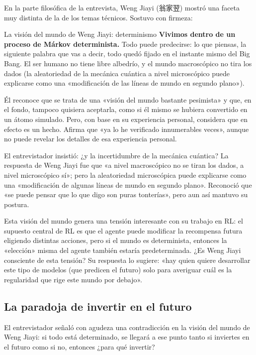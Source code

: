 \documentclass[a4paper]{article}
\begin{document}
En la parte filosófica de la entrevista, Weng Jiayi (翁家翌) mostró una faceta muy distinta de la de los temas técnicos. Sostuvo con firmeza:

\begin{importantbox}{La visión del mundo de Weng Jiayi: determinismo}
\textbf{Vivimos dentro de un proceso de Márkov determinista.} Todo puede predecirse: lo que piensas, la siguiente palabra que vas a decir, todo quedó fijado en el instante mismo del Big Bang. El ser humano no tiene libre albedrío, y el mundo macroscópico no tira los dados (la aleatoriedad de la mecánica cuántica a nivel microscópico puede explicarse como una «modificación de las líneas de mundo en segundo plano»).
\end{importantbox}

Él reconoce que se trata de una «visión del mundo bastante pesimista» y que, en el fondo, tampoco quisiera aceptarla, como si él mismo se hubiera convertido en un átomo simulado. Pero, con base en su experiencia personal, considera que en efecto es un hecho. Afirma que «ya lo he verificado innumerables veces», aunque no puede revelar los detalles de esa experiencia personal.

El entrevistador insistió: ¿y la incertidumbre de la mecánica cuántica? La respuesta de Weng Jiayi fue que «a nivel macroscópico no se tiran los dados, a nivel microscópico sí»; pero la aleatoriedad microscópica puede explicarse como una «modificación de algunas líneas de mundo en segundo plano». Reconoció que «se puede pensar que lo que digo son puras tonterías», pero aun así mantuvo su postura.

Esta visión del mundo genera una tensión interesante con su trabajo en RL: el supuesto central de RL es que el agente puede modificar la recompensa futura eligiendo distintas acciones, pero si el mundo es determinista, entonces la «elección» misma del agente también estaría predeterminada. ¿Es Weng Jiayi consciente de esta tensión? Su respuesta lo sugiere: «hay quien quiere desarrollar este tipo de modelos (que predicen el futuro) solo para averiguar cuál es la regularidad que rige este mundo por debajo».

\subsection{La paradoja de invertir en el futuro}

El entrevistador señaló con agudeza una contradicción en la visión del mundo de Weng Jiayi: si todo está determinado, se llegará a ese punto tanto si inviertes en el futuro como si no, entonces ¿para qué invertir?
\end{document}
